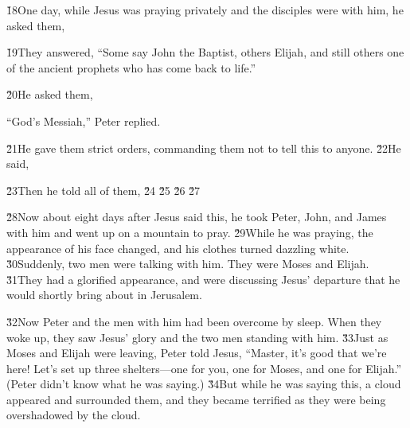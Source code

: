 \v{18}One day, while Jesus was praying privately and the disciples were with him, he asked them, 

\v{19}They answered, ``Some say John the Baptist, others Elijah, and still others one of the ancient prophets who has come back to life.''

\v{20}He asked them, 

``God's Messiah,'' Peter replied.

\v{21}He gave them strict orders, commanding them not to tell this to anyone. \v{22}He said, 

\v{23}Then he told all of them, \red{,} \v{24} \v{25} \v{26}  \v{27}

\v{28}Now about eight days after Jesus said this, he took Peter, John, and James with him and went up on a mountain to pray. \v{29}While he was praying, the appearance of his face changed, and his clothes turned dazzling white. \v{30}Suddenly, two men were talking with him. They were Moses and Elijah. \v{31}They had a glorified appearance, and were discussing Jesus' departure that he would shortly bring about in Jerusalem.

\v{32}Now Peter and the men with him had been overcome by sleep. When they woke up, they saw Jesus' glory and the two men standing with him. \v{33}Just as Moses and Elijah were leaving, Peter told Jesus, ``Master, it's good that we're here! Let's set up three shelters---one for you, one for Moses, and one for Elijah.'' (Peter didn't know what he was saying.) \v{34}But while he was saying this, a cloud appeared and surrounded them, and they became terrified as they were being overshadowed by the cloud.

